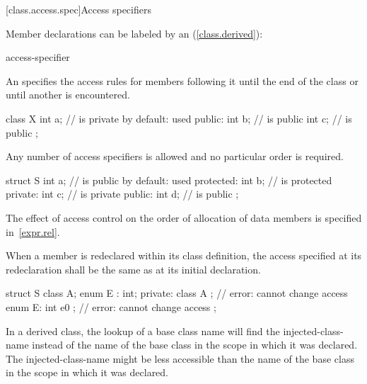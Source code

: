 [class.access.spec]{Access specifiers}%

\pnum
Member declarations can be labeled by an
(\ref{class.derived}):

\begin{ncsimplebnf}
access-specifier \terminal{:} 
\end{ncsimplebnf}

An
specifies the access rules for members following it
until the end of the class or until another
is encountered.
\begin{example}
\begin{codeblock}
class X {
  int a;            //  is private by default:  used
public:
  int b;            //  is public
  int c;            //  is public
};
\end{codeblock}
\end{example}

\pnum
Any number of access specifiers is allowed and no particular order is required.
\begin{example}
\begin{codeblock}
struct S {
  int a;            //  is public by default:  used
protected:
  int b;            //  is protected
private:
  int c;            //  is private
public:
  int d;            //  is public
};
\end{codeblock}
\end{example}

\pnum
\begin{note}
The effect of access control on the order of allocation
of data members is specified in~\ref{expr.rel}.
\end{note}

\pnum
When a member is redeclared within its class definition,
the access specified at its redeclaration shall
be the same as at its initial declaration.
\begin{example}
\begin{codeblock}
struct S {
  class A;
  enum E : int;
private:
  class A { };                  // error: cannot change access
  enum E: int { e0 };           // error: cannot change access
};
\end{codeblock}
\end{example}

\pnum
\begin{note}
In a derived class, the lookup of a base class name will find the
injected-class-name instead of the name of the base class in the scope
in which it was declared. The injected-class-name might be less accessible
than the name of the base class in the scope in which it was declared.
\end{note}


